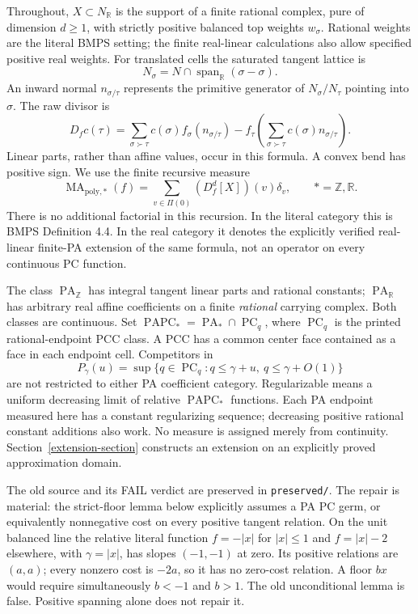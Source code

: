 \documentclass[11pt]{article}
\newcommand{\R}{\mathbb R}
\newcommand{\Z}{\mathbb Z}
\newcommand{\PC}{\operatorname{PC}}
\newcommand{\PA}{\operatorname{PA}}
\newcommand{\PAPC}{\operatorname{PAPC}}
\newcommand{\MAstar}{\operatorname{MA}_{\mathrm{poly},*}}
\begin{document}
Throughout, \(X\subset N_\R\) is the support of a finite rational complex,
pure of dimension \(d\geq1\), with strictly positive balanced top weights
\(w_\sigma\). Rational weights are the literal BMPS setting; the finite
real-linear calculations also allow specified positive real weights.
For translated cells the saturated tangent lattice is
\[
 N_\sigma=N\cap\operatorname{span}_\R(\sigma-\sigma).
\]
An inward normal \(n_{\sigma/\tau}\) represents the primitive generator of
\(N_\sigma/N_\tau\) pointing into \(\sigma\). The raw divisor is
\begin{equation}\label{raw}
 D_f c(\tau)=\sum_{\sigma\succ\tau}c(\sigma)f_\sigma(n_{\sigma/\tau})
 -f_\tau\left(\sum_{\sigma\succ\tau}c(\sigma)n_{\sigma/\tau}\right).
\end{equation}
Linear parts, rather than affine values, occur in this formula. A convex
bend has positive sign. We use the finite recursive measure
\[
 \MAstar(f)=\sum_{v\in\Pi(0)}(D_f^d[X])(v)\delta_v,\qquad *=\Z,\R.
\]
There is no additional factorial in this recursion. In the literal
category this is BMPS Definition 4.4. In the real category it denotes
the explicitly verified real-linear finite-PA extension of the same
formula, not an operator on every continuous PC function.

The class \(\PA_\Z\) has integral tangent linear parts and rational
constants; \(\PA_\R\) has arbitrary real affine coefficients on a finite
\emph{rational} carrying complex. Both classes are continuous.
Set \(\PAPC_*=\PA_*\cap\PC_q\), where \(\PC_q\) is the printed
rational-endpoint PCC class. A PCC has a common center face contained as
a face in each endpoint cell. Competitors in
\begin{equation}\label{env}
 P_\gamma(u)=\sup\{q\in\PC_q:q\leq\gamma+u,\ q\leq\gamma+O(1)\}
\end{equation}
are not restricted to either PA coefficient category.
Regularizable means a uniform decreasing limit of relative
\(\PAPC_*\) functions. Each PA endpoint measured here has a constant
regularizing sequence; decreasing positive rational constant additions
also work. No measure is assigned merely from continuity. Section~\ref{extension-section}
constructs an extension on an explicitly proved approximation domain.

The old source and its FAIL verdict are preserved in \texttt{preserved/}.
The repair is material: the strict-floor lemma below explicitly assumes a
PA PC germ, or equivalently nonnegative cost on every positive tangent
relation. On the unit balanced line the relative literal function
$f=-|x|$ for $|x|\leq1$ and $f=|x|-2$ elsewhere, with $\gamma=|x|$,
has slopes $(-1,-1)$ at zero. Its positive relations are $(a,a)$; every
nonzero cost is $-2a$, so it has no zero-cost relation. A floor $bx$ would
require simultaneously $b<-1$ and $b>1$. The old unconditional lemma is
false. Positive spanning alone does not repair it.
\end{document}
